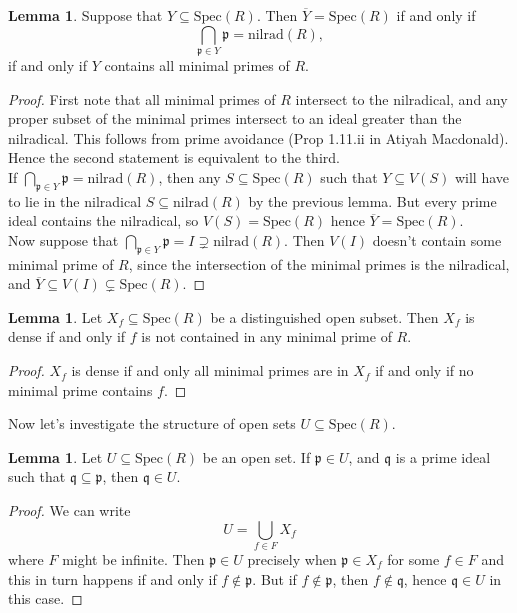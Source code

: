 \documentclass{article}
\theoremstyle{definition}
\newtheorem{lemma}[theorem]{Lemma}
\newcommand{\Spec}{\text{Spec}}
\newcommand{\nilrad}{\text{nilrad}}
\begin{document}
\begin{lemma}
	Suppose that $Y \subseteq \Spec(R)$. Then
	$\overline{Y} = \Spec(R)$ if and only if 
	\[
		\bigcap_{\mathfrak{p} \in Y} \mathfrak{p}
		=
		\nilrad(R),
	\] 
	if and only if $Y$ contains all minimal primes of $R$.
\end{lemma}
\begin{proof}
	First note that all minimal primes of $R$ intersect to the nilradical, and
	any proper subset of the minimal primes intersect to an ideal greater than
	the nilradical. This follows from prime avoidance (Prop 1.11.ii in Atiyah
	Macdonald). Hence the second statement is equivalent to the third. \\

	If $\bigcap_{\mathfrak{p} \in Y} \mathfrak{p} = \nilrad(R)$, then any $S
	\subseteq \Spec(R)$ such that $Y \subseteq V(S)$ will have to lie in the
	nilradical $S \subseteq \nilrad(R)$ by the previous lemma. But every prime
	ideal contains the nilradical, so $V(S) = \Spec(R)$ hence $\overline{Y} =
	\Spec(R)$. \\

	Now suppose that $\bigcap_{\mathfrak{p} \in Y} \mathfrak{p} = I \supsetneq
	\nilrad(R)$. Then $V(I)$ doesn't contain some minimal prime of $R$, since
	the intersection of the minimal primes is the nilradical, and $\overline{Y}
	\subseteq V(I) \subsetneq \Spec(R)$.
\end{proof}

\begin{lemma}
	Let $X_f \subseteq \Spec(R)$ be a distinguished open subset. Then $X_f$ is
	dense if and only if $f$ is not contained in any minimal prime of $R$.
\end{lemma}
\begin{proof}
	$X_f$ is dense if and only all minimal primes are in $X_f$ if and only 
	if no minimal prime contains $f$.
\end{proof}

Now let's investigate the structure of open sets $U \subseteq \Spec(R)$.

\begin{lemma}
	Let $U \subseteq \Spec(R)$ be an open set. If $\mathfrak{p} \in U$, and
	$\mathfrak{q}$ is a prime ideal such that $\mathfrak{q} \subseteq
	\mathfrak{p}$, then $\mathfrak{q} \in U$.
\end{lemma}
\begin{proof}
	We can write 
	\[
		U = \bigcup_{f \in F} X_f
	\] 
	where $F$ might be infinite. Then $\mathfrak{p} \in U$ precisely when
	$\mathfrak{p} \in X_f$ for some $f \in F$ and this in turn happens if and
	only if $f \not \in \mathfrak{p}$. But if $f \not \in \mathfrak{p}$, then
	$f \not \in \mathfrak{q}$, hence $\mathfrak{q} \in U$ in this case.
\end{proof}
\end{document}
